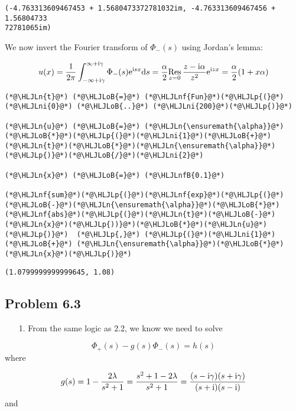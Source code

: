 \documentclass[12pt,landscape]{article}
\newcommand{\HLJLn}[1]{#1}
\newcommand{\HLJLnf}[1]{\textcolor[RGB]{66,102,213}{#1}}
\newcommand{\HLJLnfB}[1]{\textcolor[RGB]{59,151,46}{#1}}
\newcommand{\HLJLni}[1]{\textcolor[RGB]{59,151,46}{#1}}
\newcommand{\HLJLoB}[1]{\textcolor[RGB]{102,102,102}{\textbf{#1}}}
\newcommand{\HLJLp}[1]{#1}
\def\D{ {\rm d} }
\def\I{ {\rm i} }
\def\E{ {\rm e} }
\def\Res_#1{\underset{#1}{\rm Res}\,}
\begin{document}
{\begin{lstlisting}
(-4.763313609467453 + 1.5680473372781032im, -4.763313609467456 + 1.56804733
72781065im)
\end{lstlisting}


We now invert the Fourier transform of $\Phi_-(s)$ using Jordan's lemma:

\[
u(x) = {1 \over 2 \pi} \int_{-\infty + \I \gamma}^{\infty + \I \gamma} \Phi_-(s) \E^{\I s x} \D s = {\alpha \over 2}\Res_{z = 0} {z- \I \alpha \over z^2} \E^{\I z x}  = {\alpha \over 2} (1+x \alpha)
\]

\begin{lstlisting}
(*@\HLJLn{t}@*) (*@\HLJLoB{=}@*) (*@\HLJLnf{Fun}@*)(*@\HLJLp{(}@*)(*@\HLJLni{0}@*) (*@\HLJLoB{..}@*) (*@\HLJLni{200}@*)(*@\HLJLp{)}@*)

(*@\HLJLn{u}@*) (*@\HLJLoB{=}@*) (*@\HLJLn{\ensuremath{\alpha}}@*)(*@\HLJLoB{*}@*)(*@\HLJLp{(}@*)(*@\HLJLni{1}@*)(*@\HLJLoB{+}@*)(*@\HLJLn{t}@*)(*@\HLJLoB{*}@*)(*@\HLJLn{\ensuremath{\alpha}}@*)(*@\HLJLp{)}@*)(*@\HLJLoB{/}@*)(*@\HLJLni{2}@*)

(*@\HLJLn{x}@*) (*@\HLJLoB{=}@*) (*@\HLJLnfB{0.1}@*)

(*@\HLJLnf{sum}@*)(*@\HLJLp{(}@*)(*@\HLJLnf{exp}@*)(*@\HLJLp{(}@*)(*@\HLJLoB{-}@*)(*@\HLJLn{\ensuremath{\alpha}}@*)(*@\HLJLoB{*}@*)(*@\HLJLnf{abs}@*)(*@\HLJLp{(}@*)(*@\HLJLn{t}@*)(*@\HLJLoB{-}@*)(*@\HLJLn{x}@*)(*@\HLJLp{))}@*)(*@\HLJLoB{*}@*)(*@\HLJLn{u}@*)(*@\HLJLp{)}@*)  (*@\HLJLp{,}@*) (*@\HLJLp{(}@*)(*@\HLJLni{1}@*) (*@\HLJLoB{+}@*) (*@\HLJLn{\ensuremath{\alpha}}@*)(*@\HLJLoB{*}@*)(*@\HLJLn{x}@*)(*@\HLJLp{)}@*)
\end{lstlisting}

\begin{lstlisting}
(1.0799999999999645, 1.08)
\end{lstlisting}


\subsection{Problem 6.3}
\begin{itemize}
\item[1. ] From the same logic as 2.2, we know we need to solve

\end{itemize}
\[
\Phi_+(s) - g(s) \Phi_-(s) = h(s)
\]
where

\[
g(s) = 1 - {2 \lambda \over s^2 + 1} = {s^2 +1-2 \lambda \over s^2 + 1} = {(s- \I\gamma)(s+\I \gamma) \over (s+\I)(s-\I)}
\]
and

}
\end{document}
